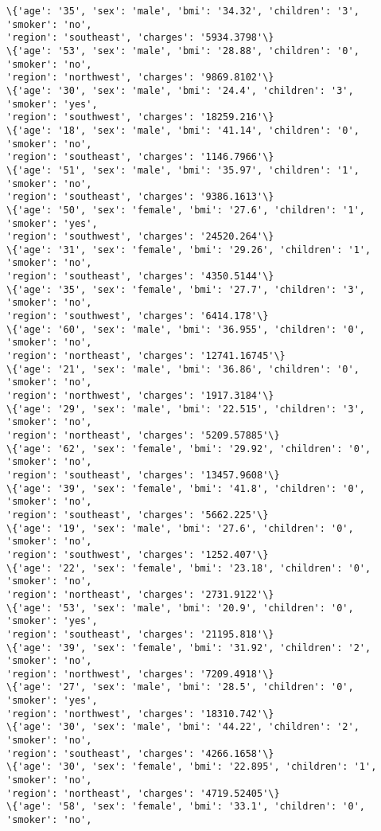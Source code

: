 \documentclass[11pt]{article}
\begin{document}
\begin{Verbatim}[commandchars=\\\{\}]
\{'age': '35', 'sex': 'male', 'bmi': '34.32', 'children': '3', 'smoker': 'no',
'region': 'southeast', 'charges': '5934.3798'\}
\{'age': '53', 'sex': 'male', 'bmi': '28.88', 'children': '0', 'smoker': 'no',
'region': 'northwest', 'charges': '9869.8102'\}
\{'age': '30', 'sex': 'male', 'bmi': '24.4', 'children': '3', 'smoker': 'yes',
'region': 'southwest', 'charges': '18259.216'\}
\{'age': '18', 'sex': 'male', 'bmi': '41.14', 'children': '0', 'smoker': 'no',
'region': 'southeast', 'charges': '1146.7966'\}
\{'age': '51', 'sex': 'male', 'bmi': '35.97', 'children': '1', 'smoker': 'no',
'region': 'southeast', 'charges': '9386.1613'\}
\{'age': '50', 'sex': 'female', 'bmi': '27.6', 'children': '1', 'smoker': 'yes',
'region': 'southwest', 'charges': '24520.264'\}
\{'age': '31', 'sex': 'female', 'bmi': '29.26', 'children': '1', 'smoker': 'no',
'region': 'southeast', 'charges': '4350.5144'\}
\{'age': '35', 'sex': 'female', 'bmi': '27.7', 'children': '3', 'smoker': 'no',
'region': 'southwest', 'charges': '6414.178'\}
\{'age': '60', 'sex': 'male', 'bmi': '36.955', 'children': '0', 'smoker': 'no',
'region': 'northeast', 'charges': '12741.16745'\}
\{'age': '21', 'sex': 'male', 'bmi': '36.86', 'children': '0', 'smoker': 'no',
'region': 'northwest', 'charges': '1917.3184'\}
\{'age': '29', 'sex': 'male', 'bmi': '22.515', 'children': '3', 'smoker': 'no',
'region': 'northeast', 'charges': '5209.57885'\}
\{'age': '62', 'sex': 'female', 'bmi': '29.92', 'children': '0', 'smoker': 'no',
'region': 'southeast', 'charges': '13457.9608'\}
\{'age': '39', 'sex': 'female', 'bmi': '41.8', 'children': '0', 'smoker': 'no',
'region': 'southeast', 'charges': '5662.225'\}
\{'age': '19', 'sex': 'male', 'bmi': '27.6', 'children': '0', 'smoker': 'no',
'region': 'southwest', 'charges': '1252.407'\}
\{'age': '22', 'sex': 'female', 'bmi': '23.18', 'children': '0', 'smoker': 'no',
'region': 'northeast', 'charges': '2731.9122'\}
\{'age': '53', 'sex': 'male', 'bmi': '20.9', 'children': '0', 'smoker': 'yes',
'region': 'southeast', 'charges': '21195.818'\}
\{'age': '39', 'sex': 'female', 'bmi': '31.92', 'children': '2', 'smoker': 'no',
'region': 'northwest', 'charges': '7209.4918'\}
\{'age': '27', 'sex': 'male', 'bmi': '28.5', 'children': '0', 'smoker': 'yes',
'region': 'northwest', 'charges': '18310.742'\}
\{'age': '30', 'sex': 'male', 'bmi': '44.22', 'children': '2', 'smoker': 'no',
'region': 'southeast', 'charges': '4266.1658'\}
\{'age': '30', 'sex': 'female', 'bmi': '22.895', 'children': '1', 'smoker': 'no',
'region': 'northeast', 'charges': '4719.52405'\}
\{'age': '58', 'sex': 'female', 'bmi': '33.1', 'children': '0', 'smoker': 'no',

\end{Verbatim}
\end{document}
